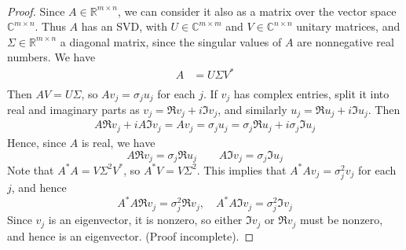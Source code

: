 \documentclass[12pt]{article}
\newenvironment{sol}[1][Solution]{\begin{trivlist}
		\item[\hskip \labelsep {\bfseries #1:}]}{\end{trivlist}}
\begin{document}
\begin{sol}
	\
	\begin{proof}
		Since $A\in\mathbb{R}^{m\times n}$, we can consider it also as a matrix over the vector space
		$\mathbb{C}^{m\times n}$. Thus $A$ has an SVD, with $U\in\mathbb{C}^{m\times m}$ and
		$V\in\mathbb{C}^{n\times n}$ unitary matrices, and $\Sigma\in\mathbb{R}^{m\times n}$ a diagonal
		matrix, since the singular values of $A$ are nonnegative real numbers. We have
		\begin{align*}
			A&=U\Sigma V^*\\
		\end{align*}
		Then $AV=U\Sigma$, so $Av_j=\sigma_j u_j$ for each $j$. If $v_j$ has complex entries, split it into
		real and imaginary parts as $v_j=\Re v_j + i\Im v_j$, and similarly $u_j=\Re u_j+i\Im u_j$. Then
		\begin{align*}
			A\Re v_j + iA\Im v_j = Av_j = \sigma_j u_j = \sigma_j \Re u_j + i \sigma_j \Im u_j
		\end{align*}
		Hence, since $A$ is real, we have
		\[
		A\Re v_j = \sigma_j \Re u_j\quad \quad A\Im v_j=\sigma_j \Im u_j
		\]
		Note that $A^*A=V\Sigma^2V^*$, so $A^*V=V\Sigma^2$. This implies that $A^*Av_j=\sigma_j^2v_j$ for each $j$,
		and hence
		\[
		A^*A\Re v_j = \sigma_j^2 \Re v_j,\quad A^*A\Im v_j = \sigma_j^2\Im v_j
		\]
		Since $v_j$ is an eigenvector, it is nonzero, so either $\Im v_j$ or $\Re v_j$ must be nonzero,
		and hence is an eigenvector. (Proof incomplete).
	\end{proof}
\end{sol}
\end{document}
